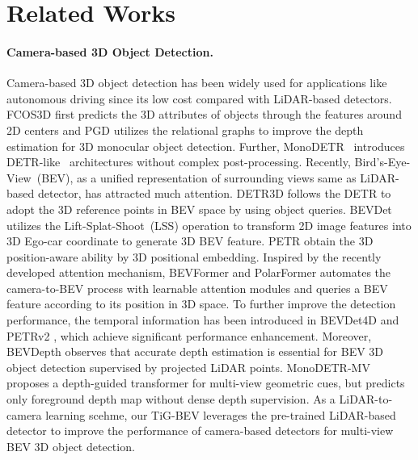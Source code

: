 

\section{Related Works}
\paragraph{Camera-based 3D Object Detection.} Camera-based 3D object detection has been widely used for applications like autonomous driving since its low cost compared with LiDAR-based detectors. FCOS3D \cite{b12} first predicts the 3D attributes of objects through the features around 2D centers and PGD \cite{b17} utilizes the relational graphs to improve the depth estimation for 3D monocular object detection. Further, MonoDETR~\cite{b47} introduces DETR-like~\cite{b18} architectures without complex post-processing.
Recently, Bird’s-Eye-View~(BEV), as a unified representation of surrounding views same as LiDAR-based detector, has attracted much attention. DETR3D \cite{b13} follows the DETR \cite{b18} to adopt the 3D reference points in BEV space by using object queries. BEVDet \cite{b19} utilizes the Lift-Splat-Shoot~(LSS) operation \cite{b20} to transform 2D image features into 3D Ego-car coordinate to generate 3D BEV feature. PETR \cite{b21} obtain the 3D position-aware ability by 3D positional embedding. Inspired by the recently developed attention mechanism, BEVFormer \cite{b11} and PolarFormer \cite{b22} automates the camera-to-BEV process with learnable attention modules and queries a BEV feature according to its position in 3D space. To further improve the detection performance, the temporal information has been introduced in BEVDet4D \cite{b23} and PETRv2 \cite{b24}, which achieve significant performance enhancement. Moreover, BEVDepth \cite{b7} observes that accurate depth estimation is essential for BEV 3D object detection supervised by projected LiDAR points. MonoDETR-MV~\cite{b48} proposes a depth-guided transformer for multi-view geometric cues, but predicts only foreground depth map without dense depth supervision. As a LiDAR-to-camera learning scehme, our TiG-BEV leverages the pre-trained LiDAR-based detector to improve the performance of camera-based detectors for multi-view BEV 3D object detection.


